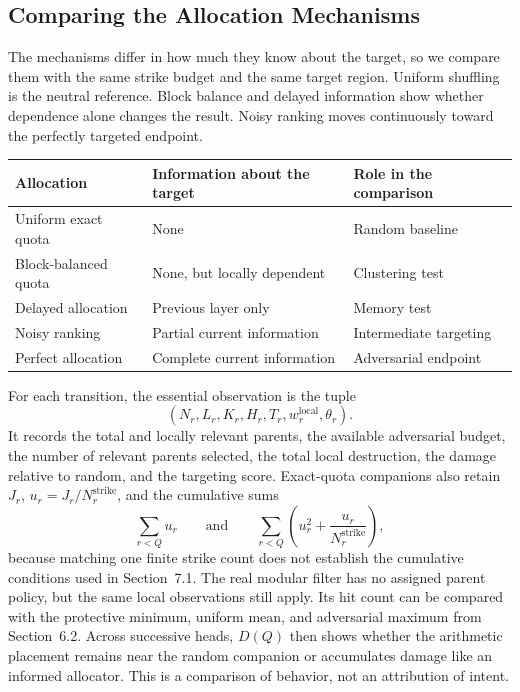 \subsection{Comparing the Allocation Mechanisms}
The mechanisms differ in how much they know about the target, so we compare them with the same strike budget and the same target region. Uniform shuffling is the neutral reference. Block balance and delayed information show whether dependence alone changes the result. Noisy ranking moves continuously toward the perfectly targeted endpoint.
\begin{longtable}{lll}
\toprule
Allocation & Information about the target & Role in the comparison \\
\midrule
Uniform exact quota & None & Random baseline \\
Block-balanced quota & None, but locally dependent & Clustering test \\
Delayed allocation & Previous layer only & Memory test \\
Noisy ranking & Partial current information & Intermediate targeting \\
Perfect allocation & Complete current information & Adversarial endpoint \\
\bottomrule
\end{longtable}
For each transition, the essential observation is the tuple
\begin{equation*}
(N_r,L_r,K_r,H_r,T_r,w_r^{\mathrm{local}},\theta_r).
\end{equation*}
It records the total and locally relevant parents, the available adversarial budget, the number of relevant parents selected, the total local destruction, the damage relative to random, and the targeting score. Exact-quota companions also retain $J_r$, $u_r=J_r/N_r^{\mathrm{strike}}$, and the cumulative sums
\begin{equation*}
\sum_{r < Q}u_r
\qquad\text{and}\qquad
\sum_{r < Q}\left(u_r^2+\frac{u_r}{N_r^{\mathrm{strike}}}\right),
\end{equation*}
because matching one finite strike count does not establish the cumulative conditions used in Section~7.1.
The real modular filter has no assigned parent policy, but the same local observations still apply. Its hit count can be compared with the protective minimum, uniform mean, and adversarial maximum from Section~6.2. Across successive heads, $D(Q)$ then shows whether the arithmetic placement remains near the random companion or accumulates damage like an informed allocator. This is a comparison of behavior, not an attribution of intent.

